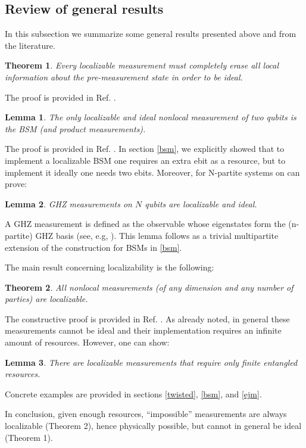 \documentclass[12pt]{article}
\newtheorem{theorem}{Theorem}
\newtheorem{lemma}{Lemma}
\begin{document}
\subsection{Review of general results}
\label{general}
In this subsection we summarize some general results presented above and from the literature.
\begin{theorem}
Every localizable measurement must completely erase all local information  about the pre-measurement state in order to be ideal.
\end{theorem}
\noindent The proof is provided in Ref. \cite{popescu1994causality}.
\begin{lemma}
        The only localizable and ideal nonlocal measurement of two qubits is the BSM (and product measurements).
\end{lemma}
\noindent The proof is provided in Ref. \cite{popescu1994causality}. In section \ref{bsm}, we explicitly showed that to implement a localizable BSM one requires an extra ebit as a resource, but to implement it ideally one needs two ebits. Moreover, for N-partite systems on can prove:
\begin{lemma}
        GHZ measurements on $N$ qubits are localizable and ideal.
        \end{lemma}
\noindent A GHZ measurement is defined as the observable whose eigenstates form the (n-partite) GHZ basis (see, e.g, \cite{de2020protocols}).
This lemma follows as a trivial multipartite extension of the construction for BSMs in \ref{bsm}.

The main result concerning localizability is the following:
\begin{theorem}
        All nonlocal measurements (of any dimension and any number of parties) are localizable.
\end{theorem}
\noindent The constructive proof is provided in Ref. \cite{vaidman2003instantaneous}. As already noted, in general these measurements cannot be ideal and their implementation  requires an infinite amount of resources. However, one can show:
\begin{lemma}
    There are localizable measurements that require only finite entangled resources.
\end{lemma}
\noindent Concrete examples are provided in sections \ref{twisted}, \ref{bsm}, and \ref{ejm}.

In conclusion, given enough resources, “impossible” measurements are always localizable (Theorem 2), hence physically possible, but cannot in general be ideal (Theorem 1).
\end{document}
